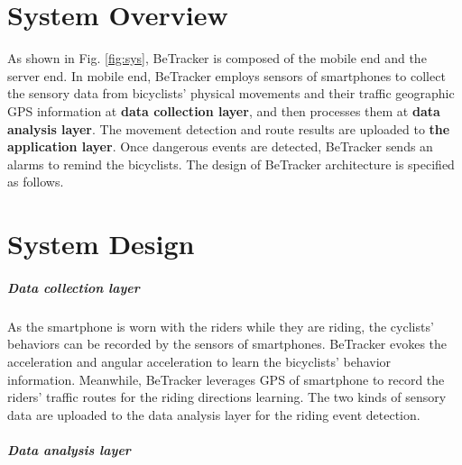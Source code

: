 \documentclass{sigchi-ext}
\def\sysname{BeTracker }
\begin{document}


\section{ System Overview}
As shown in Fig. \ref{fig:sys}, \sysname is composed of the mobile end and the server end.  In mobile end, \sysname employs sensors of smartphones to collect the sensory data from bicyclists' physical movements and their traffic geographic GPS information at \textbf{data collection layer}, and then processes them at \textbf{data analysis layer}. The movement detection and route results are uploaded to \textbf{the application layer}. Once dangerous events are detected, \sysname sends an alarms to remind the bicyclists. 
The design of \sysname architecture is specified as follows.

\section{System Design} 
\subparagraph{Data collection layer}
As the smartphone is worn with the riders while they are riding, the cyclists' behaviors can be recorded by the sensors of smartphones.  \sysname evokes the acceleration and angular acceleration to learn the bicyclists' behavior information. Meanwhile, \sysname leverages GPS of smartphone to record the riders' traffic routes for the riding directions learning. 
The two kinds of sensory data are uploaded to the data analysis layer for the riding event detection.
\subparagraph{Data analysis layer} 
\end{document}

